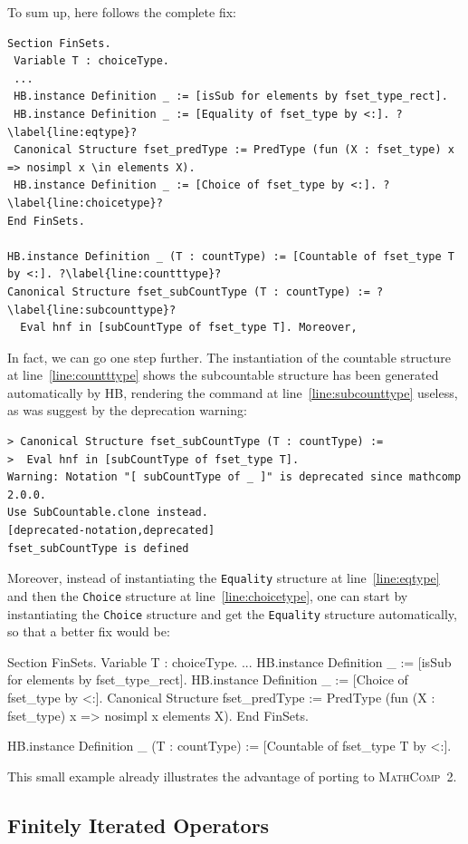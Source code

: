 \documentclass{article}
\def\mathcomp{\textsc{MathComp}}
\def\mathcomptwo{\mathcomp~2}
\def\hb{\textsc{HB}}
\def\coqin#1{\texttt{#1}}
\begin{document}
To sum up, here follows the complete fix:
\begin{verbatim}
Section FinSets.
 Variable T : choiceType.
 ...
 HB.instance Definition _ := [isSub for elements by fset_type_rect].
 HB.instance Definition _ := [Equality of fset_type by <:]. ?\label{line:eqtype}?
 Canonical Structure fset_predType := PredType (fun (X : fset_type) x => nosimpl x \in elements X).
 HB.instance Definition _ := [Choice of fset_type by <:]. ?\label{line:choicetype}?
End FinSets.

HB.instance Definition _ (T : countType) := [Countable of fset_type T by <:]. ?\label{line:countttype}?
Canonical Structure fset_subCountType (T : countType) := ?\label{line:subcounttype}?
  Eval hnf in [subCountType of fset_type T]. Moreover, 
\end{verbatim}

In fact, we can go one step further. The instantiation of the
countable structure at line~\ref{line:countttype} shows the
subcountable structure has been generated automatically by \hb,
rendering the command at line~\ref{line:subcounttype} useless, as was
suggest by the deprecation warning:
\begin{verbatim}
> Canonical Structure fset_subCountType (T : countType) :=
>  Eval hnf in [subCountType of fset_type T].
Warning: Notation "[ subCountType of _ ]" is deprecated since mathcomp 2.0.0.
Use SubCountable.clone instead.
[deprecated-notation,deprecated]
fset_subCountType is defined
\end{verbatim}
Moreover, instead of instantiating the \coqin{Equality} structure at
line~\ref{line:eqtype} and then the \coqin{Choice} structure at
line~\ref{line:choicetype}, one can start by instantiating the
\coqin{Choice} structure and get the \coqin{Equality} structure
automatically, so that a better fix would be:
\begin{success}
Section FinSets.
 Variable T : choiceType.
 ...
 HB.instance Definition _ := [isSub for elements by fset_type_rect].
 HB.instance Definition _ := [Choice of fset_type by <:].
 Canonical Structure fset_predType := PredType (fun (X : fset_type) x => nosimpl x \in elements X).
End FinSets.

HB.instance Definition _ (T : countType) := [Countable of fset_type T by <:].
\end{success}
This small example already illustrates the advantage of porting to \mathcomptwo.

\subsection{Finitely Iterated Operators}
\end{document}

